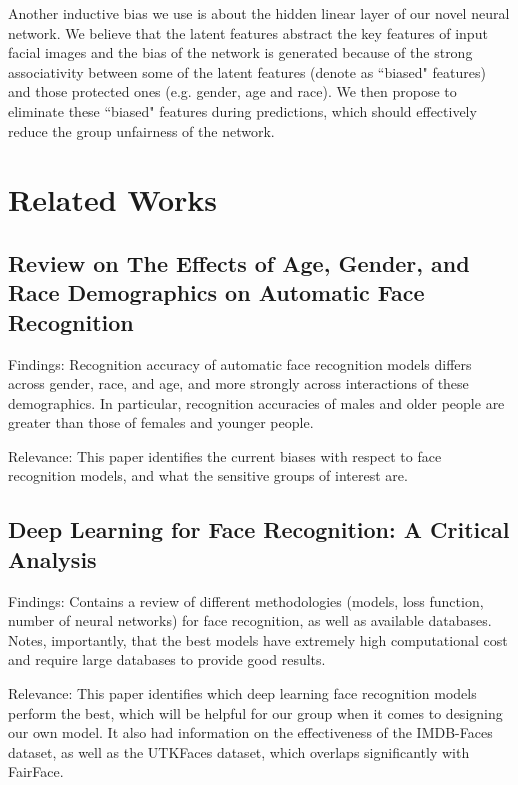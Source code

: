 \documentclass{article}
\begin{document}
Another inductive bias we use is about the hidden linear layer of our novel neural network. We believe that the latent features abstract the key features of input facial images and the bias of the network is generated because of the strong associativity between some of the latent features (denote as ``biased" features) and those protected ones (e.g. gender, age and race). We then propose to eliminate these ``biased" features during predictions, which should effectively reduce the group unfairness of the network.


\section{Related Works}

\subsection{Review on The Effects of Age, Gender, and Race Demographics on Automatic Face Recognition \cite{abdurrahim2017review}}

Findings: Recognition accuracy of automatic face recognition models differs across gender, race, and age, and more strongly across interactions of these demographics. In particular, recognition accuracies of males and older people are greater than those of females and younger people.

\noindent Relevance: This paper identifies the current biases with respect to face recognition models, and what the sensitive groups of interest are.

\subsection{Deep Learning for Face Recognition: A Critical Analysis \cite{shepley2019deep}}

Findings: Contains a review of different methodologies (models, loss function, number of neural networks) for face recognition, as well as available databases. Notes, importantly, that the best models have extremely high computational cost and require large databases to provide good results.

\noindent Relevance: This paper identifies which deep learning face recognition models perform the best, which will be helpful for our group when it comes to designing our own model. It also had information on the effectiveness of the IMDB-Faces dataset, as well as the UTKFaces dataset, which overlaps significantly with FairFace.
\end{document}
